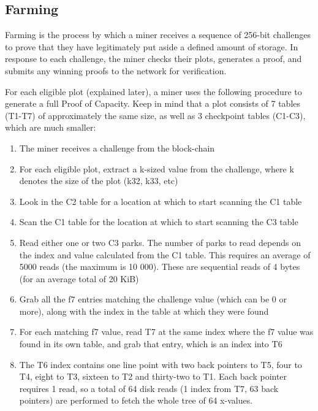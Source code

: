\subsection{Farming}
\begin{flushleft}
    Farming is the process by which a miner receives a sequence of 256-bit challenges to prove that they have legitimately put aside a defined amount of storage. In response to each challenge, the miner checks their plots, generates a proof, and submits any winning proofs to the network for verification.
\end{flushleft}
\begin{flushleft}
    For each eligible plot (explained later), a miner uses the following procedure to generate a full Proof of Capacity. Keep in mind that a plot consists of 7 tables (T1-T7) of approximately the same size, as well as 3 checkpoint tables (C1-C3), which are much smaller:
\end{flushleft}
\begin{enumerate}
    \item The miner receives a challenge from the block-chain
    \item For each eligible plot, extract a k-sized value from the challenge, where k denotes the size of the plot (k32, k33, etc)
    \item Look in the C2 table for a location at which to start scanning the C1 table
    \item Scan the C1 table for the location at which to start scanning the C3 table
    \item Read either one or two C3 parks. The number of parks to read depends on the index and value calculated from the C1 table. This requires an average of 5000 reads (the maximum is 10 000). These are sequential reads of 4 bytes (for an average total of 20 KiB)
    \item Grab all the f7 entries matching the challenge value (which can be 0 or more), along with the index in the table at which they were found
    \item For each matching f7 value, read T7 at the same index where the f7 value was found in its own table, and grab that entry, which is an index into T6
    \item The T6 index contains one line point with two back pointers to T5, four to T4, eight to T3, sixteen to T2 and thirty-two to T1. Each back pointer requires 1 read, so a total of 64 disk reads (1 index from T7, 63 back pointers) are performed to fetch the whole tree of 64 x-values.
\end{enumerate}
